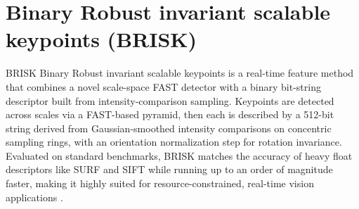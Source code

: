 \section{Binary Robust invariant scalable keypoints (BRISK)}
BRISK Binary Robust invariant scalable keypoints is a real-time feature method that combines a novel scale-space FAST detector with a binary bit-string descriptor built from intensity-comparison sampling. Keypoints are detected across scales via a FAST-based pyramid, then each is described by a 512-bit string derived from Gaussian-smoothed intensity comparisons on concentric sampling rings, with an orientation normalization step for rotation invariance. Evaluated on standard benchmarks, BRISK matches the accuracy of heavy float descriptors like SURF and SIFT while running up to an order of magnitude faster, making it highly suited for resource-constrained, real-time vision applications \cite{ref_brisk}.